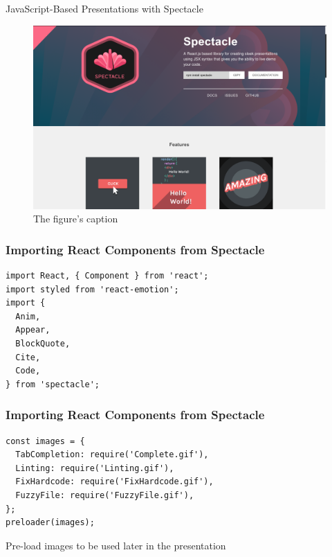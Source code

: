 \documentclass[14pt,aspectratio=169]{beamer}
\begin{document}
%
\begin{frame}{JavaScript-Based Presentations with Spectacle}
  \begin{figure}
    \centering
    \includegraphics[scale=.08]{images/spectacle-javascript.png}
    \caption{The figure's caption}
  \end{figure}
\end{frame}

%
\begin{frame}[fragile]
  \frametitle{Importing React Components from Spectacle}
  \normalsize
  \hspace*{-.2in}
  \begin{minipage}{6in}
    \vspace*{.1in}
    \begin{verbatim}
import React, { Component } from 'react';
import styled from 'react-emotion';
import {
  Anim,
  Appear,
  BlockQuote,
  Cite,
  Code,
} from 'spectacle';
    \end{verbatim}
  \end{minipage}
\end{frame}

%
\begin{frame}[fragile]
  \frametitle{Importing React Components from Spectacle}
  \normalsize
  \hspace*{-.2in}
  \begin{minipage}{6in}
    \vspace*{.2in}
    \begin{verbatim}
const images = {
  TabCompletion: require('Complete.gif'),
  Linting: require('Linting.gif'),
  FixHardcode: require('FixHardcode.gif'),
  FuzzyFile: require('FuzzyFile.gif'),
};
preloader(images);
    \end{verbatim}
  \end{minipage}
  \vspace*{.1in}
  \begin{center}
    Pre-load images to be used later in the presentation \\
  \end{center}
\end{frame}
\end{document}
